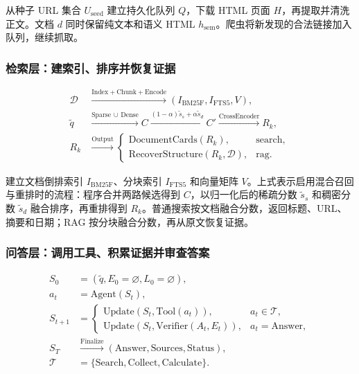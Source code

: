 \documentclass[UTF8,zihao=-4,fontset=fandol]{ctexart}
\begin{document}
 从种子 URL 集合 $U_{\mathrm{seed}}$ 建立持久化队列 $Q$，下载 HTML 页面 $H$，再提取并清洗正文。文档 $d$ 同时保留纯文本和语义 HTML $h_{\mathrm{sem}}$。爬虫将新发现的合法链接加入队列，继续抓取。

\subsubsection*{检索层：建索引、排序并恢复证据}

\begin{equation}
\begin{aligned}
\mathcal D&\xrightarrow{\mathrm{Index+Chunk+Encode}}
(I_{\mathrm{BM25F}},I_{\mathrm{FTS5}},V),\\
\tilde q&\xrightarrow{\mathrm{Sparse}\,\cup\,\mathrm{Dense}}C
\xrightarrow{(1-\alpha)\tilde s_s+\alpha\tilde s_d}C'
\xrightarrow{\mathrm{CrossEncoder}}R_k,\\
R_k&\xrightarrow{\mathrm{Output}}
\begin{cases}
\mathrm{DocumentCards}(R_k),&\mathrm{search},\\
\mathrm{RecoverStructure}(R_k,\mathcal D),&\mathrm{rag}.
\end{cases}
\end{aligned}
\label{eq:architecture-retrieval}
\end{equation}

 建立文档倒排索引 $I_{\mathrm{BM25F}}$、分块索引 $I_{\mathrm{FTS5}}$ 和向量矩阵 $V$。上式表示启用混合召回与重排时的流程：程序合并两路候选得到 $C$，以归一化后的稀疏分数 $\tilde s_s$ 和稠密分数 $\tilde s_d$ 融合排序，再重排得到 $R_k$。普通搜索按文档融合分数，返回标题、URL、摘要和日期；RAG 按分块融合分数，再从原文恢复证据。

\subsubsection*{问答层：调用工具、积累证据并审查答案}

\begin{equation}
\begin{aligned}
S_0&=(\tilde q,E_0=\varnothing,L_0=\varnothing),\\
a_t&=\mathrm{Agent}(S_t),\\
S_{t+1}&=
\begin{cases}
\mathrm{Update}(S_t,\mathrm{Tool}(a_t)),&a_t\in\mathcal T,\\
\mathrm{Update}(S_t,\mathrm{Verifier}(A_t,E_t)),&a_t=\mathrm{Answer},
\end{cases}\\
S_T&\xrightarrow{\mathrm{Finalize}}(\mathrm{Answer},\mathrm{Sources},\mathrm{Status}),\\
\mathcal T&=\{\mathrm{Search},\mathrm{Collect},\mathrm{Calculate}\}.
\end{aligned}
\label{eq:architecture-rag}
\end{equation}
\end{document}
